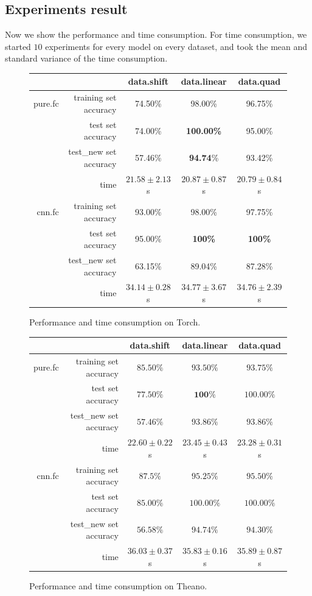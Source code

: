 \documentclass[a4paper]{article}
\begin{document}
\subsection{Experiments result}

Now we show the performance and time consumption. For time consumption, we started $10$ experiments for every model on every dataset, and took the mean and standard variance of the time consumption.

\begin{figure}[H]
\centering
\begin{tabular}{|r|r|c|c|c|}
\hline
 & & data.shift & data.linear & data.quad \\
\hline
pure.fc & training set accuracy & 74.50\% & 98.00\% & 96.75\% \\
 & test set accuracy & 74.00\% & \textbf{100.00\%} & 95.00\% \\
 & test\_new set accuracy & 57.46\% & \textbf{94.74}\% & 93.42\%\\
 & time & $21.58 \pm 2.13$ s & $20.87 \pm 0.87$ s & $20.79 \pm 0.84$ s\\
\hline
cnn.fc & training set accuracy & 93.00\% & 98.00\% &97.75\%\\
 & test set accuracy & 95.00\% &\textbf{100\%} &\textbf{100\%}\\
 & test\_new set accuracy & 63.15\% & 89.04\% &87.28\%\\
 & time & $34.14 \pm 0.28$s & $34.77 \pm 3.67$s & $34.76 \pm 2.39$s\\
\hline
\end{tabular}
\caption{Performance and time consumption on Torch.}
\end{figure}

\begin{figure}[H]
\centering
\begin{tabular}{|r|r|c|c|c|}
\hline
 & & data.shift & data.linear & data.quad \\
\hline
pure.fc & training set accuracy & $85.50\%$ & $93.50\%$ & $93.75\%$ \\
 & test set accuracy & $77.50\%$ & $\mathbf{100\%}$ & $\mathbf{100.00\%}$ \\
 & test\_new set accuracy & $57.46\%$ & $93.86\%$ & $93.86\%$ \\
 & time & $22.60\pm0.22$s & $23.45\pm0.43$s & $23.28\pm0.31$s \\
\hline
cnn.fc & training set accuracy & $87.5\%$ & $95.25\%$ & $95.50\%$ \\
 & test set accuracy & $85.00\%$ & $\mathbf{100.00\%}$ & $100.00\%$ \\
 & test\_new set accuracy & $56.58\%$ & $94.74\%$ & $94.30\%$ \\
 & time & $36.03\pm0.37$s & $35.83\pm0.16$s & $35.89\pm0.87$s\\
\hline
\end{tabular}
\caption{Performance and time consumption on Theano.}
\end{figure}
\end{document}
